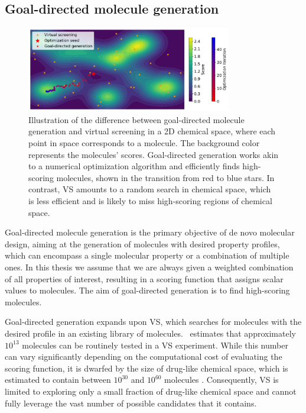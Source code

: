 \subsection{Goal-directed molecule generation}
\begin{figure}
	\centering
	\includegraphics[width=0.8\textwidth]{./figures/goal_directed_generation_vs.pdf}
	\caption{Illustration of the difference between goal-directed molecule generation and virtual
		screening in a 2D chemical space, where each point in space corresponds to a molecule. The
		background color represents the molecules' scores. Goal-directed generation works
		akin to a numerical optimization algorithm and efficiently finds high-scoring molecules,
		shown in the transition from red to blue stars. In contrast, VS amounts to a random search in chemical space, which is less efficient
		and is likely to miss high-scoring regions of chemical space. \label{fig:goal-directed-generation}}
\end{figure}

Goal-directed molecule generation is the primary objective of de novo molecular design, aiming at
the generation of molecules with desired property profiles, which can encompass a single molecular
property or a combination of multiple ones. In this thesis we assume that we are always given a
weighted combination of all properties of interest, resulting in a scoring function that assigns
scalar values to molecules. The aim of goal-directed generation is to find high-scoring molecules.

Goal-directed generation expands upon \ac{VS}, which searches for molecules with the desired profile
in an existing library of molecules.\ \citet{waltersVirtualChemicalLibraries2019} estimates that approximately
$10^{13}$ molecules can be routinely tested in a \ac{VS} experiment. While this number can vary
significantly depending on the computational cost of evaluating the scoring function, it is dwarfed
by the size of drug-like chemical space, which is estimated to contain between $10^{30}$ and
$10^{60}$ molecules \citep{waltersVirtualChemicalLibraries2019,ruddigkeitEnumeration166Billion2012}.
Consequently, \ac{VS} is limited to exploring only a small fraction of drug-like chemical space and cannot
fully leverage the vast number of possible candidates that it contains.

